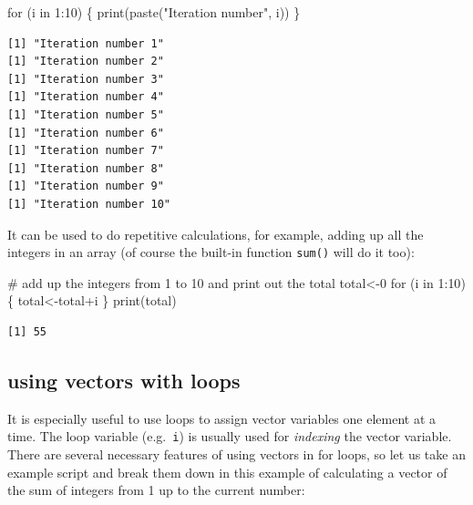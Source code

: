 \documentclass[
  letterpaper,
  DIV=11,
  numbers=noendperiod]{scrreprt}
\newenvironment{Shaded}{\begin{snugshade}}{\end{snugshade}}
\newcommand{\CommentTok}[1]{\textcolor[rgb]{0.37,0.37,0.37}{#1}}
\newcommand{\ControlFlowTok}[1]{\textcolor[rgb]{0.00,0.23,0.31}{#1}}
\newcommand{\DecValTok}[1]{\textcolor[rgb]{0.68,0.00,0.00}{#1}}
\newcommand{\FunctionTok}[1]{\textcolor[rgb]{0.28,0.35,0.67}{#1}}
\newcommand{\NormalTok}[1]{\textcolor[rgb]{0.00,0.23,0.31}{#1}}
\newcommand{\OtherTok}[1]{\textcolor[rgb]{0.00,0.23,0.31}{#1}}
\newcommand{\SpecialCharTok}[1]{\textcolor[rgb]{0.37,0.37,0.37}{#1}}
\newcommand{\StringTok}[1]{\textcolor[rgb]{0.13,0.47,0.30}{#1}}
\begin{document}
\begin{Shaded}
\begin{Highlighting}[]
\ControlFlowTok{for}\NormalTok{ (i }\ControlFlowTok{in} \DecValTok{1}\SpecialCharTok{:}\DecValTok{10}\NormalTok{) \{}
  \FunctionTok{print}\NormalTok{(}\FunctionTok{paste}\NormalTok{(}\StringTok{"Iteration number"}\NormalTok{, i))}
\NormalTok{\}}
\end{Highlighting}
\end{Shaded}

\begin{verbatim}
[1] "Iteration number 1"
[1] "Iteration number 2"
[1] "Iteration number 3"
[1] "Iteration number 4"
[1] "Iteration number 5"
[1] "Iteration number 6"
[1] "Iteration number 7"
[1] "Iteration number 8"
[1] "Iteration number 9"
[1] "Iteration number 10"
\end{verbatim}

It can be used to do repetitive calculations, for example, adding up all
the integers in an array (of course the built-in function \texttt{sum()}
will do it too):

\begin{Shaded}
\begin{Highlighting}[]
\CommentTok{\# add up the integers from 1 to 10 and print out the total}
\NormalTok{total}\OtherTok{\textless{}{-}}\DecValTok{0}
\ControlFlowTok{for}\NormalTok{ (i }\ControlFlowTok{in} \DecValTok{1}\SpecialCharTok{:}\DecValTok{10}\NormalTok{) \{}
\NormalTok{  total}\OtherTok{\textless{}{-}}\NormalTok{total}\SpecialCharTok{+}\NormalTok{i}
\NormalTok{\}}
\FunctionTok{print}\NormalTok{(total)}
\end{Highlighting}
\end{Shaded}

\begin{verbatim}
[1] 55
\end{verbatim}

\hypertarget{using-vectors-with-loops}{%
\subsection{using vectors with loops}\label{using-vectors-with-loops}}

It is especially useful to use loops to assign vector variables one
element at a time. The loop variable (e.g.~\texttt{i}) is usually used
for \emph{indexing} the vector variable. There are several necessary
features of using vectors in for loops, so let us take an example script
and break them down in this example of calculating a vector of the sum
of integers from 1 up to the current number:
\end{document}
